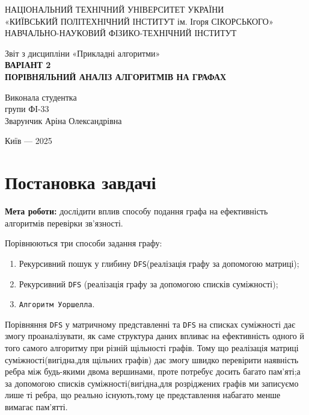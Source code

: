 \documentclass[12pt,a4paper]{article}
\begin{document}
\begin{titlepage}
    \centering
    \normalsize
    НАЦІОНАЛЬНИЙ ТЕХНІЧНИЙ УНІВЕРСИТЕТ УКРАЇНИ\\
    «КИЇВСЬКИЙ ПОЛІТЕХНІЧНИЙ ІНСТИТУТ ім. Ігоря СІКОРСЬКОГО»\\
    НАВЧАЛЬНО-НАУКОВИЙ ФІЗИКО-ТЕХНІЧНИЙ ІНСТИТУТ
    
    \vfill
    
    \LARGE Звіт з дисципліни «Прикладні алгоритми»\\[2em]
    \Large\textbf{ВАРІАНТ 2}\\[1em]
    \LARGE\textbf{ПОРІВНЯЛЬНИЙ АНАЛІЗ АЛГОРИТМІВ НА ГРАФАХ}\\[0.4em]
   
    
    \vfill
    
    \begin{flushright}
        \large
        Виконала студентка\\
        групи ФІ-33\\
        Зварунчик Аріна Олександрівна
    \end{flushright}
    
    \vspace{3em}
    Київ — 2025
\end{titlepage}

\tableofcontents 
\newpage

\section{Постановка завдачі}
\textbf{Мета роботи:}
дослідити вплив способу подання графа на ефективність алгоритмів перевірки зв’язності.


Порівнюються три способи задання графу:
\begin{enumerate}
    \item Рекурсивний пошук у глибину \texttt{DFS}(реалізація графу за допомогою матриці);
    \item Рекурсивний \texttt{DFS} (реалізація графу за допомогою списків суміжності);
    \item \texttt{Алгоритм Уоршелла}.
\end{enumerate}

Порівняння  \texttt{DFS} у матричному представленні та  \texttt{DFS} на списках суміжності дає змогу проаналізувати,
як саме структура даних впливає на ефективність одного й того самого алгоритму при різній щільності графів.
Тому що реалізація матриці суміжності(вигідна,для щільних графів) дає змогу швидко перевірити наявність ребра між будь-якими двома вершинами, 
 проте потребує досить багато пам’яті;а за допомогою списків суміжності(вигідна,для розріджених графів ми записуємо лише ті ребра, що реально існують,тому це представлення набагато менше вимагає пам'ятті.
\end{document}

